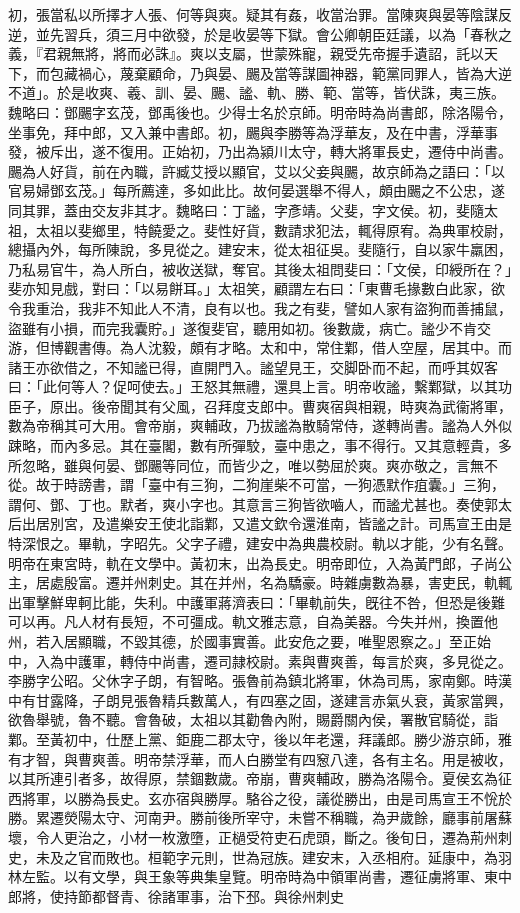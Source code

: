 \begin{pinyinscope}
初，張當私以所擇才人張、何等與爽。疑其有姦，收當治罪。當陳爽與晏等陰謀反逆，並先習兵，須三月中欲發，於是收晏等下獄。會公卿朝臣廷議，以為「春秋之義，『君親無將，將而必誅』。爽以支屬，世蒙殊寵，親受先帝握手遺詔，託以天下，而包藏禍心，蔑棄顧命，乃與晏、颺及當等謀圖神器，範黨同罪人，皆為大逆不道」。於是收爽、羲、訓、晏、颺、謐、軌、勝、範、當等，皆伏誅，夷三族。魏略曰：鄧颺字玄茂，鄧禹後也。少得士名於京師。明帝時為尚書郎，除洛陽令，坐事免，拜中郎，又入兼中書郎。初，颺與李勝等為浮華友，及在中書，浮華事發，被斥出，遂不復用。正始初，乃出為潁川太守，轉大將軍長史，遷侍中尚書。颺為人好貨，前在內職，許臧艾授以顯官，艾以父妾與颺，故京師為之語曰：「以官易婦鄧玄茂。」每所薦達，多如此比。故何晏選舉不得人，頗由颺之不公忠，遂同其罪，蓋由交友非其才。魏略曰：丁謐，字彥靖。父斐，字文侯。初，斐隨太祖，太祖以斐鄉里，特饒愛之。斐性好貨，數請求犯法，輒得原宥。為典軍校尉，總攝內外，每所陳說，多見從之。建安末，從太祖征吳。斐隨行，自以家牛羸困，乃私易官牛，為人所白，被收送獄，奪官。其後太祖問斐曰：「文侯，印綬所在？」斐亦知見戲，對曰：「以易餅耳。」太祖笑，顧謂左右曰：「東曹毛掾數白此家，欲令我重治，我非不知此人不清，良有以也。我之有斐，譬如人家有盜狗而善捕鼠，盜雖有小損，而完我囊貯。」遂復斐官，聽用如初。後數歲，病亡。謐少不肯交游，但博觀書傳。為人沈毅，頗有才略。太和中，常住鄴，借人空屋，居其中。而諸王亦欲借之，不知謐已得，直開門入。謐望見王，交脚卧而不起，而呼其奴客曰：「此何等人？促呵使去。」王怒其無禮，還具上言。明帝收謐，繫鄴獄，以其功臣子，原出。後帝聞其有父風，召拜度支郎中。曹爽宿與相親，時爽為武衞將軍，數為帝稱其可大用。會帝崩，爽輔政，乃拔謐為散騎常侍，遂轉尚書。謐為人外似踈略，而內多忌。其在臺閣，數有所彈駮，臺中患之，事不得行。又其意輕貴，多所忽略，雖與何晏、鄧颺等同位，而皆少之，唯以勢屈於爽。爽亦敬之，言無不從。故于時謗書，謂「臺中有三狗，二狗崖柴不可當，一狗憑默作疽囊。」三狗，謂何、鄧、丁也。默者，爽小字也。其意言三狗皆欲嚙人，而謐尤甚也。奏使郭太后出居別宮，及遣樂安王使北詣鄴，又遣文欽令還淮南，皆謐之計。司馬宣王由是特深恨之。畢軌，字昭先。父字子禮，建安中為典農校尉。軌以才能，少有名聲。明帝在東宮時，軌在文學中。黃初末，出為長史。明帝即位，入為黃門郎，子尚公主，居處殷富。遷并州刺史。其在并州，名為驕豪。時雜虜數為暴，害吏民，軌輒出軍擊鮮卑軻比能，失利。中護軍蔣濟表曰：「畢軌前失，旣往不咎，但恐是後難可以再。凡人材有長短，不可彊成。軌文雅志意，自為美器。今失并州，換置他州，若入居顯職，不毀其德，於國事實善。此安危之要，唯聖恩察之。」至正始中，入為中護軍，轉侍中尚書，遷司隷校尉。素與曹爽善，每言於爽，多見從之。李勝字公昭。父休字子朗，有智略。張魯前為鎮北將軍，休為司馬，家南鄭。時漢中有甘露降，子朗見張魯精兵數萬人，有四塞之固，遂建言赤氣乆衰，黃家當興，欲魯舉號，魯不聽。會魯破，太祖以其勸魯內附，賜爵關內侯，署散官騎從，詣鄴。至黃初中，仕歷上黨、鉅鹿二郡太守，後以年老還，拜議郎。勝少游京師，雅有才智，與曹爽善。明帝禁浮華，而人白勝堂有四䆫八達，各有主名。用是被收，以其所連引者多，故得原，禁錮數歲。帝崩，曹爽輔政，勝為洛陽令。夏侯玄為征西將軍，以勝為長史。玄亦宿與勝厚。駱谷之役，議從勝出，由是司馬宣王不恱於勝。累遷熒陽太守、河南尹。勝前後所宰守，未嘗不稱職，為尹歲餘，廳事前屠蘇壞，令人更治之，小材一枚激墮，正檛受符吏石虎頭，斷之。後旬日，遷為荊州刺史，未及之官而敗也。桓範字元則，世為冠族。建安末，入丞相府。延康中，為羽林左監。以有文學，與王象等典集皇覽。明帝時為中領軍尚書，遷征虜將軍、東中郎將，使持節都督青、徐諸軍事，治下邳。與徐州刺史
\end{pinyinscope}
